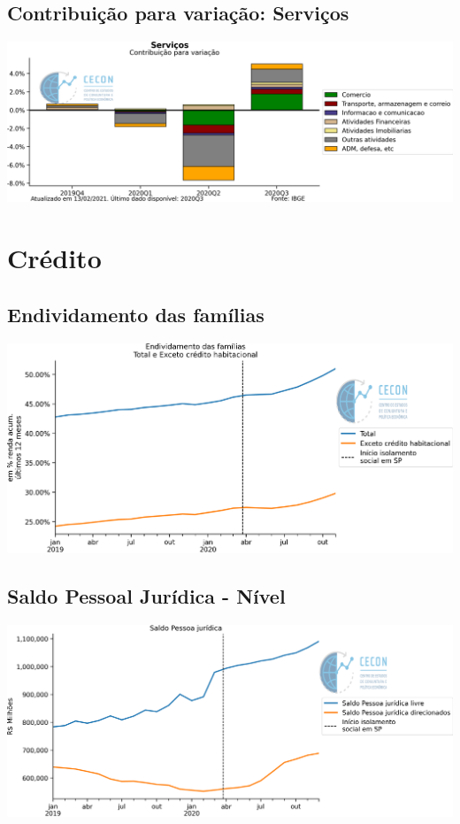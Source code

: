 \documentclass{SelfArx}
\begin{document}
\subsection*{Contribuição para variação: Serviços}
\label{sec:org8e1bff9}

\begin{center}
\includegraphics[width=.9\linewidth]{./figs/PIB/Contrib_Servicos.png}
\end{center}

\section*{Crédito}
\label{sec:org1fe3f9f}

\subsection*{Endividamento das famílias}
\label{sec:orgd486013}

\begin{center}
\includegraphics[width=.9\linewidth]{./figs/Credito/EndividamentoFamilias.png}
\end{center}


\subsection*{Saldo Pessoal Jurídica - Nível}
\label{sec:orgf8b1899}

\begin{center}
\includegraphics[width=.9\linewidth]{./figs/Credito/SaldoPJ.png}
\end{center}
\end{document}
